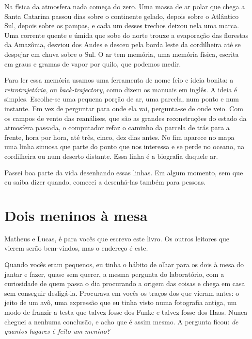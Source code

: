 \documentclass[
  brazilian,
  11pt,
  openany]{book}
\begin{document}
Na física da atmosfera nada começa do zero. Uma massa de ar polar que
chega a Santa Catarina passou dias sobre o continente gelado, depois
sobre o Atlântico Sul, depois sobre os pampas, e cada um desses trechos
deixou nela uma marca. Uma corrente quente e úmida que sobe do norte
trouxe a evaporação das florestas da Amazônia, desviou dos Andes e
desceu pela borda leste da cordilheira até se despejar em chuva sobre o
Sul. O ar tem memória, uma memória física, escrita em graus e gramas de
vapor por quilo, que podemos medir.

Para ler essa memória usamos uma ferramenta de nome feio e ideia bonita:
a \emph{retrotrajetória}, ou \emph{back-trajectory}, como dizem os
manuais em inglês. A ideia é simples. Escolhe-se uma pequena porção de
ar, uma parcela, num ponto e num instante. Em vez de perguntar para onde
ela vai, pergunta-se de onde veio. Com os campos de vento das
reanálises, que são as grandes reconstruções do estado da atmosfera
passada, o computador refaz o caminho da parcela de trás para a frente,
hora por hora, até três, cinco, dez dias antes. No fim aparece no mapa
uma linha sinuosa que parte do ponto que nos interessa e se perde no
oceano, na cordilheira ou num deserto distante. Essa linha é a biografia
daquele ar.

Passei boa parte da vida desenhando essas linhas. Em algum momento, sem
que eu saiba dizer quando, comecei a desenhá-las também para pessoas.

\section{Dois meninos à mesa}\label{dois-meninos-uxe0-mesa}

Matheus e Lucas, é para vocês que escrevo este livro. Os outros leitores
que vierem serão bem-vindos, mas o endereço é este.

Quando vocês eram pequenos, eu tinha o hábito de olhar para os dois à
mesa do jantar e fazer, quase sem querer, a mesma pergunta do
laboratório, com a curiosidade de quem passa o dia procurando a origem
das coisas e chega em casa sem conseguir desligá-la. Procurava em vocês
os traços dos que vieram antes: o jeito de um avô, uma expressão que eu
tinha visto numa fotografia antiga, um modo de franzir a testa que
talvez fosse dos Funke e talvez fosse dos Haas. Nunca cheguei a nenhuma
conclusão, e acho que é assim mesmo. A pergunta ficou: \emph{de quantos
lugares é feito um menino?}
\end{document}
